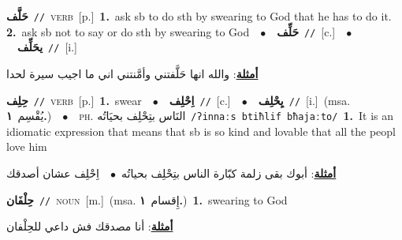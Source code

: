 \documentclass[10pt,a4paper,twoside]{article} %
\begin{document}
\begin{multicols}{2}
{\setlength\topsep{0pt}\textbf{\foreignlanguage{arabic}{حَلَّف}}\ {\color{gray}\texttt{//}\color{black}}\ \textsc{verb}\ [p.]\ \textbf{1.}~ask sb to do sth by swearing to God that he has to do it.  \textbf{2.}~ask sb not to say or do sth by swearing to God\ \ $\bullet$\ \ \setlength\topsep{0pt}\textbf{\foreignlanguage{arabic}{حَلِّف}}\ {\color{gray}\texttt{//}\color{black}}\ [c.]\ \ $\bullet$\ \ \setlength\topsep{0pt}\textbf{\foreignlanguage{arabic}{يحَلِّف}}\ {\color{gray}\texttt{//}\color{black}}\ [i.]\  \begin{flushright}\color{gray}\foreignlanguage{arabic}{\textbf{\underline{\foreignlanguage{arabic}{أمثلة}}}: والله انها حَلَّفتني وأمَّنتني اني ما اجيب سيرة لحدا}\end{flushright}\color{black}} \vspace{2mm}

{\setlength\topsep{0pt}\textbf{\foreignlanguage{arabic}{حِلِف}}\ {\color{gray}\texttt{//}\color{black}}\ \textsc{verb}\ [p.]\ \textbf{1.}~swear\ \ $\bullet$\ \ \setlength\topsep{0pt}\textbf{\foreignlanguage{arabic}{اِحْلِف}}\ {\color{gray}\texttt{//}\color{black}}\ [c.]\ \ $\bullet$\ \ \setlength\topsep{0pt}\textbf{\foreignlanguage{arabic}{يِحْلِف}}\ {\color{gray}\texttt{//}\color{black}}\ [i.]\ \color{gray}(msa. \foreignlanguage{arabic}{يُقْسِم}~\foreignlanguage{arabic}{\textbf{١.}})\color{black}\ \ $\bullet$\ \ \textsc{ph.} \color{gray} \foreignlanguage{arabic}{النَاس بتِحْلِف بحيَاتُه}\color{black}\ {\color{gray}\texttt{/{\sffamily ʔinnaːs btiħlif bħajaːto}/}\color{black}}\ \textbf{1.}~It is an idiomatic expression that means that sb is so kind and lovable that all the peopl love him\  \begin{flushright}\color{gray}\foreignlanguage{arabic}{\textbf{\underline{\foreignlanguage{arabic}{أمثلة}}}: أبوك بقى زلمة كبّارة الناس بتِحْلِف بحياتُه\ $\bullet$\ \  اِحْلِف عشان أصدقك}\end{flushright}\color{black}} \vspace{2mm}

{\setlength\topsep{0pt}\textbf{\foreignlanguage{arabic}{حِلْفَان}}\ {\color{gray}\texttt{//}\color{black}}\ \textsc{noun}\ [m.]\ \color{gray}(msa. \foreignlanguage{arabic}{إِقسام}~\foreignlanguage{arabic}{\textbf{١.}})\color{black}\ \textbf{1.}~swearing to God\  \begin{flushright}\color{gray}\foreignlanguage{arabic}{\textbf{\underline{\foreignlanguage{arabic}{أمثلة}}}: أنا مصدقك فش داعي للحِلْفان}\end{flushright}\color{black}} \vspace{2mm}


\end{multicols}
\end{document}
